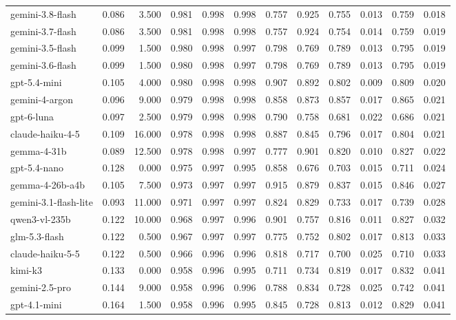 \begin{table}
\begin{tabular}{lrrrrrrrrrrr}
gemini-3.8-flash & 0.086 & 3.500 & 0.981 & 0.998 & 0.998 & 0.757 & 0.925 & 0.755 & 0.013 & 0.759 & 0.018 \\
gemini-3.7-flash & 0.086 & 3.500 & 0.981 & 0.998 & 0.998 & 0.757 & 0.924 & 0.754 & 0.014 & 0.759 & 0.019 \\
gemini-3.5-flash & 0.099 & 1.500 & 0.980 & 0.998 & 0.997 & 0.798 & 0.769 & 0.789 & 0.013 & 0.795 & 0.019 \\
gemini-3.6-flash & 0.099 & 1.500 & 0.980 & 0.998 & 0.997 & 0.798 & 0.769 & 0.789 & 0.013 & 0.795 & 0.019 \\
gpt-5.4-mini & 0.105 & 4.000 & 0.980 & 0.998 & 0.998 & 0.907 & 0.892 & 0.802 & 0.009 & 0.809 & 0.020 \\
gemini-4-argon & 0.096 & 9.000 & 0.979 & 0.998 & 0.998 & 0.858 & 0.873 & 0.857 & 0.017 & 0.865 & 0.021 \\
gpt-6-luna & 0.097 & 2.500 & 0.979 & 0.998 & 0.998 & 0.790 & 0.758 & 0.681 & 0.022 & 0.686 & 0.021 \\
claude-haiku-4-5 & 0.109 & 16.000 & 0.978 & 0.998 & 0.998 & 0.887 & 0.845 & 0.796 & 0.017 & 0.804 & 0.021 \\
gemma-4-31b & 0.089 & 12.500 & 0.978 & 0.998 & 0.997 & 0.777 & 0.901 & 0.820 & 0.010 & 0.827 & 0.022 \\
gpt-5.4-nano & 0.128 & 0.000 & 0.975 & 0.997 & 0.995 & 0.858 & 0.676 & 0.703 & 0.015 & 0.711 & 0.024 \\
gemma-4-26b-a4b & 0.105 & 7.500 & 0.973 & 0.997 & 0.997 & 0.915 & 0.879 & 0.837 & 0.015 & 0.846 & 0.027 \\
gemini-3.1-flash-lite & 0.093 & 11.000 & 0.971 & 0.997 & 0.997 & 0.824 & 0.829 & 0.733 & 0.017 & 0.739 & 0.028 \\
qwen3-vl-235b & 0.122 & 10.000 & 0.968 & 0.997 & 0.996 & 0.901 & 0.757 & 0.816 & 0.011 & 0.827 & 0.032 \\
glm-5.3-flash & 0.122 & 0.500 & 0.967 & 0.997 & 0.997 & 0.775 & 0.752 & 0.802 & 0.017 & 0.813 & 0.033 \\
claude-haiku-5-5 & 0.122 & 0.500 & 0.966 & 0.996 & 0.996 & 0.818 & 0.717 & 0.700 & 0.025 & 0.710 & 0.033 \\
kimi-k3 & 0.133 & 0.000 & 0.958 & 0.996 & 0.995 & 0.711 & 0.734 & 0.819 & 0.017 & 0.832 & 0.041 \\
gemini-2.5-pro & 0.144 & 9.000 & 0.958 & 0.996 & 0.996 & 0.788 & 0.834 & 0.728 & 0.025 & 0.742 & 0.041 \\
gpt-4.1-mini & 0.164 & 1.500 & 0.958 & 0.996 & 0.995 & 0.845 & 0.728 & 0.813 & 0.012 & 0.829 & 0.041 \\

\end{tabular}
\end{table}
